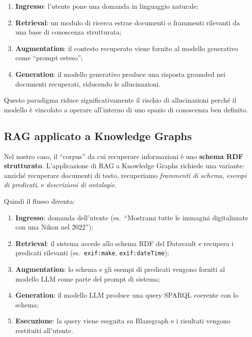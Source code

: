 \documentclass[12pt,a4paper,oneside]{book}
\newcommand{\code}[1]{\colorbox{light-gray}{\texttt{#1}}}
\begin{document}
    \begin{enumerate}
        \item \textbf{Ingresso}: l'utente pone una domanda in linguaggio naturale;
        \item \textbf{Retrieval}: un modulo di ricerca estrae documenti o frammenti rilevanti da una base di conoscenza strutturata;
        \item \textbf{Augmentation}: il contesto recuperato viene fornito al modello generativo come ``prompt esteso'';
        \item \textbf{Generation}: il modello generativo produce una risposta grounded nei documenti recuperati, riducendo le allucinazioni.
    \end{enumerate}

    Questo paradigma riduce significativamente il rischio di allucinazioni perché il modello è vincolato a operare all'interno di uno spazio di conoscenza ben definito.

    \subsection{RAG applicato a Knowledge Graphs}\label{subsec:rag_kg}

    Nel nostro caso, il ``corpus'' da cui recuperare informazioni è uno \textbf{schema RDF strutturato}. L'applicazione di RAG a Knowledge Graphs richiede una variante: anziché recuperare documenti di testo, recuperiamo \textit{frammenti di schema}, \textit{esempi di predicati}, e \textit{descrizioni di ontologie}.

    Quindi il flusso diventa:

    \begin{enumerate}
        \item \textbf{Ingresso}: domanda dell'utente (es.\ ``Mostrami tutte le immagini digitalizzate con una Nikon nel 2022'');
        \item \textbf{Retrieval}: il sistema accede allo schema RDF del Datavault e recupera i predicati rilevanti (es.\ \code{exif:make}, \code{exif:dateTime});
        \item \textbf{Augmentation}: lo schema e gli esempi di predicati vengono forniti al modello LLM come parte del prompt di sistema;
        \item \textbf{Generation}: il modello LLM produce una query SPARQL coerente con lo schema;
        \item \textbf{Esecuzione}: la query viene eseguita su Blazegraph e i risultati vengono restituiti all'utente.
    \end{enumerate}
\end{document}
